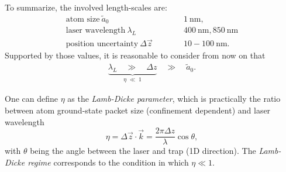 To summarize, the involved length-scales are: 
\begin{align*}
\text{atom size} ~\tilde{a}_0 \qquad \quad & 1 ~\text{nm,} \\
\text{laser wavelength} ~\lambda_L \qquad \quad  &400~\text{nm}, 850~\text{nm}\\ 
\text{position uncertainty} ~\Delta \vec{z} \qquad \quad & 10-100~\text{nm.}
\end{align*}
Supported by those values, it is reasonable to consider from now on that
\begin{align*}
    \underbrace{\lambda_L \quad \gg \quad \Delta z }_{\eta\;\ll\;1} \quad \gg \quad  \tilde{a}_0. 
\end{align*}

\begin{center}

\end{center}

One can define $\eta$ as the \textit{Lamb-Dicke parameter}, which is practically the ratio between atom ground-state packet size (confinement dependent) and laser wavelength
\begin{equation*}
\eta = \Delta\vec{z}\cdot\vec{k} =
\frac{2\pi\Delta z}{\lambda}\cos\theta,
\end{equation*}
with $\theta$ being the angle between the laser and trap (1D direction). The \textit{Lamb-Dicke regime} corresponds to the condition in which $\eta \ll 1$.


